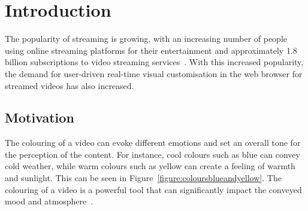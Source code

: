\documentclass[../MasterThesis.tex]{subfiles}
\begin{document}
	\newpage
	\section{Introduction} \label{section:introduction}
	
	
	The popularity of streaming is growing, with an increasing number of people using online streaming platforms for their entertainment and approximately 1.8 billion subscriptions to video streaming services~\cite{nielsen, stats}.
	With this increased popularity, the demand for user-driven real-time visual customisation in the web browser for streamed videos has also increased.
	
	
	
	
	
	
	
	
	
	
	
	
	
	
	
	
	
	
	\subsection{Motivation} \label{subsection:motivation}
	
	
	The colouring of a video can evoke different emotions and set an overall tone for the perception of the content. For instance, cool colours such as blue can convey cold weather, while warm colours such as yellow can create a feeling of warmth and sunlight. This can be seen in Figure~\ref{figure:coloursblueandyellow}.
	The colouring of a video is a powerful tool that can significantly impact the conveyed mood and atmosphere~\cite{colorgrading1, colorgrading2}.
	
	
\end{document}

